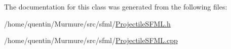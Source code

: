The documentation for this class was generated from the following files\+:\begin{DoxyCompactItemize}
\item 
/home/quentin/\+Murmure/src/sfml/\hyperlink{ProjectileSFML_8h}{Projectile\+S\+F\+M\+L.\+h}\item 
/home/quentin/\+Murmure/src/sfml/\hyperlink{ProjectileSFML_8cpp}{Projectile\+S\+F\+M\+L.\+cpp}\end{DoxyCompactItemize}
